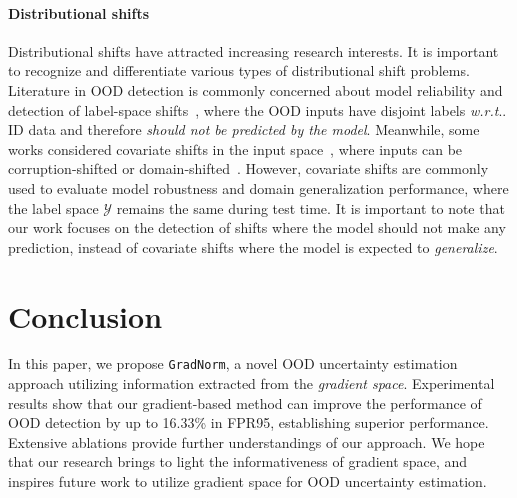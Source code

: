 \documentclass{article}
\makeatletter
\newcommand{\SL}[1]{{\color{blue}[\textbf{Sharon}: #1]}}
\DeclareRobustCommand\onedot{\futurelet\@let@token\@onedot}
\def\@onedot{\ifx\@let@token.\else.\null\fi\xspace}
\def\wrt{\emph{w.r.t}\onedot} \def\dof{d.o.f\onedot}
\makeatother
\begin{document}
\vspace{-0.2cm}
\paragraph{Distributional shifts} Distributional shifts have attracted increasing research interests. It is important to recognize and differentiate various types of distributional shift problems. Literature in OOD detection is commonly concerned about model reliability and detection of label-space shifts~\cite{hendrycks2016baseline, liang2018enhancing, liu2020energy}, where the OOD inputs have disjoint labels \wrt ID data and therefore \emph{should not be predicted by the model}. Meanwhile, some works considered covariate shifts in the input space~\citep{hendrycks2019benchmarking, malinin2021shifts, ovadia2019can}, where inputs can be corruption-shifted or domain-shifted~\citep{hsu2020generalized}. However, covariate shifts are commonly used to evaluate model robustness and domain generalization performance, where the label space $\mathcal{Y}$ remains the same during test time. It is important to note that our work focuses on the detection of shifts where the model should not make any prediction, instead of covariate shifts where the model is expected to \emph{generalize}. %


\vspace{-0.3cm}
\section{Conclusion}
\vspace{-0.2cm}
\label{sec:conclusion}
In this paper, we propose \texttt{GradNorm}, a novel OOD uncertainty estimation approach utilizing information extracted from the \emph{gradient space}. %
Experimental results show that our gradient-based method can improve the performance of OOD detection by up to  {16.33}\% in FPR95, establishing superior performance.
Extensive ablations provide further understandings of our approach. 
We hope that our research brings to light the informativeness of gradient space, and inspires future work to utilize gradient space for OOD uncertainty estimation.
\end{document}
